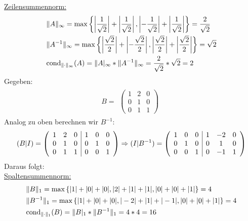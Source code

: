 \underline{Zeilensummennorm:}
\begin{align*}
\begin{split}
&\|A\|_\infty =\mathrm{max}\left\lbrace\left|\frac{1}{\sqrt2}\right|+\left|\frac{1}{\sqrt2}\right|, \left|-\frac{1}{\sqrt2}\right|+\left|\frac{1}{\sqrt2}\right|\right\rbrace=\frac{2}{\sqrt2}\\
&\|A^{-1}\|_\infty=\mathrm{max}\left\lbrace\left|\frac{\sqrt2}{2}\right|+\left|-\frac{\sqrt2}{2}\right|, \left|\frac{\sqrt2}{2}\right|+\left|\frac{\sqrt2}{2}\right|\right\rbrace={\sqrt2}\\
& \mathrm{cond}_{\| \cdot \|_\infty}(A)=\|A|_\infty*\|A^{-1}\|_\infty=\frac{2}{\sqrt2} * {\sqrt2} = 2\\
\end{split}
\end{align*}
\newline
Gegeben:\\
\begin{align*} 
B=
\begin{split}
\begin{pmatrix}
1 & 2 & 0 \\
0 & 1 & 0 \\
0 & 1 & 1
\end{pmatrix}
\end{split}
\end{align*}
Analog zu oben berechnen wir $B^{-1}$:\\
\begin{align*}
(B|I)=
\begin{split}
\begin{array}({ccc|ccc})
1 & 2 & 0 & 1 & 0 & 0\\
0 & 1 & 0 & 0 & 1 & 0\\
0 & 1 & 1 & 0 & 0 & 1
\end{array}
\Rightarrow(I|B^{-1})=
\begin{array}({ccc|ccc})
1 & 0 & 0 &1 & -2 & 0 \\
0 & 1 & 0 &0 & 1 & 0 \\
0 & 0 & 1 &0 & -1 & 1  
\end{array}
\end{split}
\end{align*}
Daraus folgt:\\
\underline{Spaltensummennorm:}
\begin{align*}
\begin{split}
&\|B\|_1=\mathrm{max} \left\lbrace|1|+|0|+|0|, |2|+|1|+|1|, |0|+|0|+|1|\right\rbrace = 4\\
&\|B^{-1}\|_1=\mathrm{max} \left\lbrace|1|+|0|+|0|, |-2|+|1|+|-1|, |0|+|0|+|1|\right\rbrace = 4\\
&\mathrm{cond}_{\| \cdot \|_1}(B)=\|B|_1*\|B^{-1}\|_1= 4 * 4 = 16\\
\end{split}
\end{align*}
